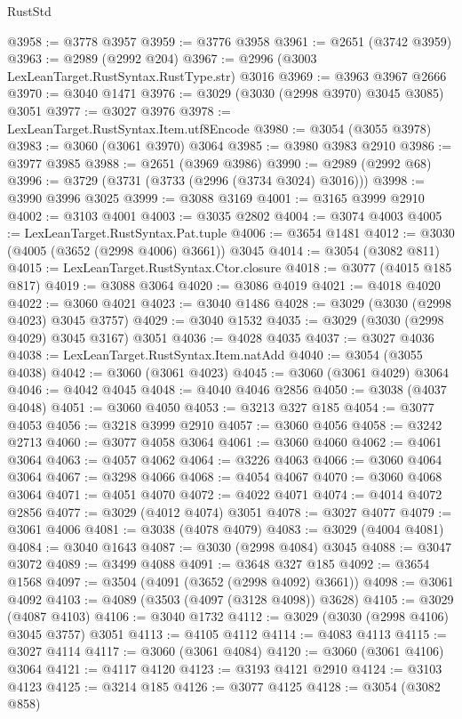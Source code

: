 \begin{lexlean}{RustStd}
\begin{coremodule}
@3958 := @3778 @3957
@3959 := @3776 @3958
@3961 := @2651 (@3742 @3959)
@3963 := @2989 (@2992 @204)
@3967 := @2996 (@3003 LexLeanTarget.RustSyntax.RustType.str) @3016
@3969 := @3963 @3967 @2666
@3970 := @3040 @1471
@3976 := @3029 (@3030 (@2998 @3970) @3045 @3085) @3051
@3977 := @3027 @3976
@3978 := LexLeanTarget.RustSyntax.Item.utf8Encode
@3980 := @3054 (@3055 @3978)
@3983 := @3060 (@3061 @3970) @3064
@3985 := @3980 @3983 @2910
@3986 := @3977 @3985
@3988 := @2651 (@3969 @3986)
@3990 := @2989 (@2992 @68)
@3996 := @3729 (@3731 (@3733 (@2996 (@3734 @3024) @3016)))
@3998 := @3990 @3996 @3025
@3999 := @3088 @3169
@4001 := @3165 @3999 @2910
@4002 := @3103 @4001
@4003 := @3035 @2802
@4004 := @3074 @4003
@4005 := LexLeanTarget.RustSyntax.Pat.tuple
@4006 := @3654 @1481
@4012 := @3030 (@4005 (@3652 (@2998 @4006) @3661)) @3045
@4014 := @3054 (@3082 @811)
@4015 := LexLeanTarget.RustSyntax.Ctor.closure
@4018 := @3077 (@4015 @185 @817)
@4019 := @3088 @3064
@4020 := @3086 @4019
@4021 := @4018 @4020
@4022 := @3060 @4021
@4023 := @3040 @1486
@4028 := @3029 (@3030 (@2998 @4023) @3045 @3757)
@4029 := @3040 @1532
@4035 := @3029 (@3030 (@2998 @4029) @3045 @3167) @3051
@4036 := @4028 @4035
@4037 := @3027 @4036
@4038 := LexLeanTarget.RustSyntax.Item.natAdd
@4040 := @3054 (@3055 @4038)
@4042 := @3060 (@3061 @4023)
@4045 := @3060 (@3061 @4029) @3064
@4046 := @4042 @4045
@4048 := @4040 @4046 @2856
@4050 := @3038 (@4037 @4048)
@4051 := @3060 @4050
@4053 := @3213 @327 @185
@4054 := @3077 @4053
@4056 := @3218 @3999 @2910
@4057 := @3060 @4056
@4058 := @3242 @2713
@4060 := @3077 @4058 @3064
@4061 := @3060 @4060
@4062 := @4061 @3064
@4063 := @4057 @4062
@4064 := @3226 @4063
@4066 := @3060 @4064 @3064
@4067 := @3298 @4066
@4068 := @4054 @4067
@4070 := @3060 @4068 @3064
@4071 := @4051 @4070
@4072 := @4022 @4071
@4074 := @4014 @4072 @2856
@4077 := @3029 (@4012 @4074) @3051
@4078 := @3027 @4077
@4079 := @3061 @4006
@4081 := @3038 (@4078 @4079)
@4083 := @3029 (@4004 @4081)
@4084 := @3040 @1643
@4087 := @3030 (@2998 @4084) @3045
@4088 := @3047 @3072
@4089 := @3499 @4088
@4091 := @3648 @327 @185
@4092 := @3654 @1568
@4097 := @3504 (@4091 (@3652 (@2998 @4092) @3661))
@4098 := @3061 @4092
@4103 := @4089 (@3503 (@4097 (@3128 @4098)) @3628)
@4105 := @3029 (@4087 @4103)
@4106 := @3040 @1732
@4112 := @3029 (@3030 (@2998 @4106) @3045 @3757) @3051
@4113 := @4105 @4112
@4114 := @4083 @4113
@4115 := @3027 @4114
@4117 := @3060 (@3061 @4084)
@4120 := @3060 (@3061 @4106) @3064
@4121 := @4117 @4120
@4123 := @3193 @4121 @2910
@4124 := @3103 @4123
@4125 := @3214 @185
@4126 := @3077 @4125
@4128 := @3054 (@3082 @858)

\end{coremodule}
\end{lexlean}
